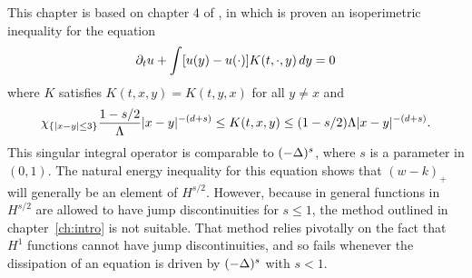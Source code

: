 %
%
%
%


%

This chapter is based on chapter 4 of \cite{CaChVa.nio}, in which is proven an isoperimetric inequality for the equation
\begin{equation} \label{eq:CCV-main}
\partial_t u + \int [u(y) - u(\cdot)] K(t,\cdot,y) \,dy = 0 
\end{equation}
where $K$ satisfies $K(t,x,y) = K(t,y,x)$ for all $y \neq x$ and 
\begin{equation} \label{CCV-coercivity for K} \chi_{\{|x-y| \leq 3\}} \frac{1-s/2}{\Lambda} |x-y|^{-(d+s)} \leq K(t,x,y) \leq (1-s/2)\Lambda |x-y|^{-(d+s)}. \end{equation}
This singular integral operator is comparable to $(-\Delta)^s$, where $s$ is a parameter in $(0,1)$.  The natural energy inequality for this equation shows that $(w-k)_+$ will generally be an element of $H^{s/2}$.  However, because in general functions in $H^{s/2}$ are allowed to have jump discontinuities for $s \leq 1$, the method outlined in chapter~\ref{ch:intro} is not suitable.  That method relies pivotally on the fact that $H^1$ functions cannot have jump discontinuities, and so fails whenever the dissipation of an equation is driven by $(-\Delta)^s$ with $s < 1$.  




